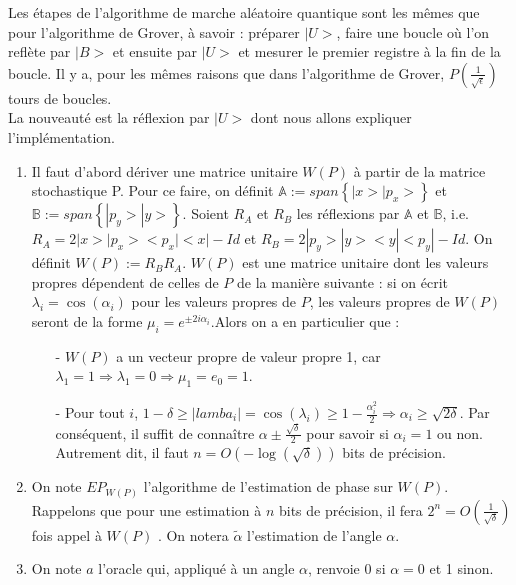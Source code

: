 \documentclass[12pt,openany]{report}
\begin{document}
Les étapes de l’algorithme de marche aléatoire quantique sont les mêmes que pour l’algorithme de Grover, à savoir : préparer $|U>$, faire une boucle où l’on reflète par $|B>$ et ensuite par $|U>$ et mesurer le premier registre à la fin de la boucle. Il y a, pour les mêmes raisons que dans l’algorithme de Grover, $ \mathit{P}(\frac{1}{\sqrt{\epsilon}}) $ tours de boucles.\\

La nouveauté est la réflexion par $|U>$ dont nous allons expliquer l’implémentation.
\begin{enumerate}
\item Il faut d’abord dériver une matrice unitaire $W(P)$ à partir de la matrice
stochastique P. Pour ce faire, on définit $\mathbb{A} := span\left\lbrace |x>|p_x>\right\rbrace $ et $\mathbb{B} :=span\left\lbrace |p_y>|y> \right\rbrace $. Soient $R_A$ et $R_B$ les réflexions par $\mathbb{A}$ et $\mathbb{B}$, i.e. $R_A =
2|x>|p_x><p_x|<x|-Id$ et $R_B = 2|p_y>|y><y|<p_y|-Id$. On définit $W(P) :=
R_BR_A$. $W(P)$ est une matrice unitaire dont les valeurs propres dépendent de celles de $P$ de la manière suivante : si on écrit $\lambda_i = \cos(\alpha_i)$ pour les
valeurs propres de $P$, les valeurs propres de $W(P)$ seront de la forme
$\mu_i = e^{±2i\alpha_i}$.Alors on a en particulier que :
\begin{itemize}
\item[-] $W(P)$ a un vecteur propre de valeur propre 1, car $\lambda_1 = 1 \Rightarrow \lambda_1 =0 \Rightarrow \mu_1 = e_0 = 1$.
\item[-] Pour tout $i$, $1-\delta  \geq \mid lamba_i\mid = \cos(\lambda_i) \geq 1-\frac{\alpha_{i}^2}{2} \Rightarrow \alpha_{i}\geq \sqrt{2\delta} $.
Par conséquent, il suffit de connaître $ \alpha\pm \frac{\sqrt{\delta}}{2} $
pour savoir si $\alpha_i = 1 $ ou
non. Autrement dit, il faut  $n = O(-\log(\sqrt{\delta}))$  bits de précision.

\end{itemize}

\item On note $EP_{W(P)} $ l’algorithme de l’estimation de phase sur $W(P)$. Rappelons
que pour une estimation à $n$ bits de précision, il fera $ 2^n= O(\frac{1}{\sqrt{\delta}}) $ fois
appel à $W(P)$ . On notera  $ \tilde{\alpha} $ l’estimation de l’angle $ \alpha $.
\item On note $a$  l’oracle qui, appliqué à un angle $\alpha$, renvoie 0 si $\alpha = 0$ et 1 sinon.

\end{enumerate}
\end{document}
